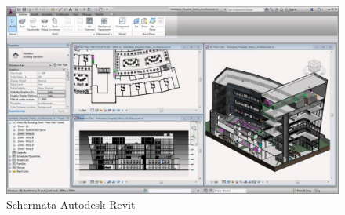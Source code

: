\begin{figure}[htbp] %
   \centering
   \includegraphics[width=1\linewidth]{images/maxresdefault}
   \caption{Schermata Autodesk Revit}
   \label{fig:revit1}
   \end{figure}
   \newpage
